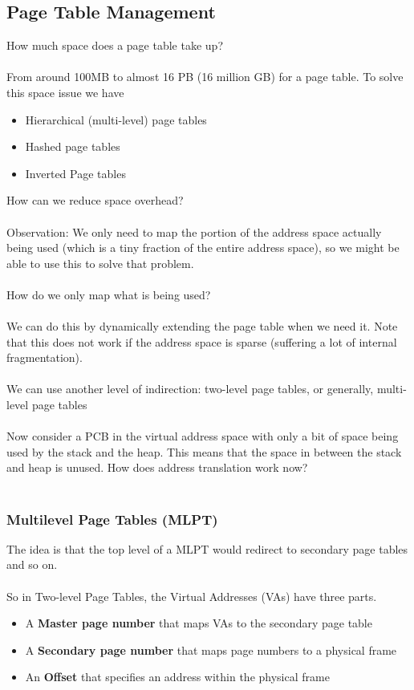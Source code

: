 \documentclass{article}
\begin{document}
\subsection{Page Table Management}

How much space does a page table take up?\\
\\
From around 100MB to almost 16 PB (16 million GB) for a page table. To solve this space issue we have
\begin{itemize}
    \item Hierarchical (multi-level) page tables
    \item Hashed page tables
    \item Inverted Page tables
\end{itemize}

How can we reduce space overhead?\\
\\
Observation: We only need to map the portion of the address space actually being used (which is a tiny fraction of the entire address space), so we might be able to use this to solve that problem.
\\
\\
How do we only map what is being used?
\\
\\
We can do this by dynamically extending the page table when we need it. Note that this does not work if the address space is sparse (suffering a lot of internal fragmentation).
\\
\\
We can use another level of indirection: two-level page tables, or generally, multi-level page tables
\\
\\
Now consider a PCB in the virtual address space with only a bit of space being used by the stack and the heap. This means that the space in between the stack and heap is unused. How does address translation work now?\\
\\
\subsubsection{Multilevel Page Tables (MLPT)}

The idea is that the top level of a MLPT would redirect to secondary page tables and so on.\\
\\
So in Two-level Page Tables, the Virtual Addresses (VAs) have three parts.
\begin{itemize}
    \item A \textbf{Master page number} that maps VAs to the secondary page table
    \item A \textbf{Secondary page number} that maps page numbers to a physical frame
    \item An \textbf{Offset} that specifies an address within the physical frame
\end{itemize}
\end{document}
